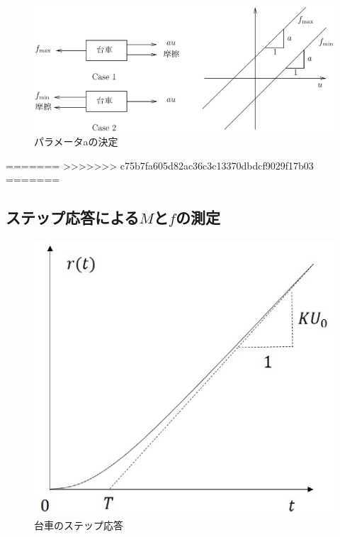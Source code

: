 \documentclass[a4j,11pt,twoside]{ujbook}
\begin{document}
\begin{figure}[htbp]
	\begin{center}
		\includegraphics[width = 0.8 \linewidth]{definition_a.eps}
		\caption{パラメータaの決定}
		\label{fig:パラメータaの決定}
	\end{center}
\end{figure}
=======
>>>>>>> c75b7fa605d82ac36c3c13370dbdcf9029f17b03
=======

	\subsection{ステップ応答による$M$と$f$の測定}

	\begin{figure}[htbp]
		\begin{center}
			\includegraphics[width = 0.6 \linewidth]{step.eps}
			\caption{台車のステップ応答}
			\label{fig:台車のステップ応答}
		\end{center}
	\end{figure}
\end{document}

